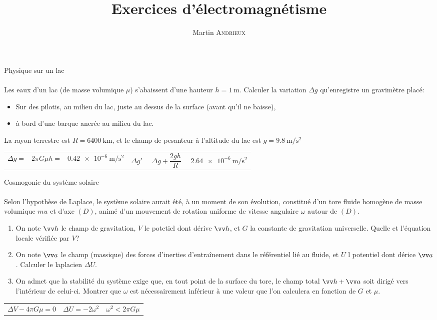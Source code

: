 \documentclass[french, a4paper, 11pt]{article}
\title{Exercices d'électromagnétisme}
\author{Martin \textsc{Andrieux}}
\date{}
\begin{document}
\maketitle

\begin{cadre}{Physique sur un lac}
  \paragraph*{}
  Les eaux d'un lac (de masse volumique \(\mu\)) s'abaissent d'une hauteur \(h=\SI{1}{\meter}\). Calculer la variation \(\Delta g\) qu'enregistre un gravimètre placé:
  \begin{itemize}[label=\(\bullet\)]
    \item Sur des pilotis, au milieu du lac, juste au dessus de la surface (avant qu'il ne baisse),
    \item à bord d'une barque ancrée au milieu du lac.
  \end{itemize}
  La rayon terrestre est \(R=\SI{6400}{\kilo\meter}\), et le champ de pesanteur à l'altitude du lac est \(g=\SI{9,8}{\meter\per\square\second}\)
  \tcblower
  \begin{tabularx}{\linewidth}{Xr}
    \(\Delta g = -2\pi G\mu h = \SI{-0.42e-6}{\meter\per\square\second}\)&
    \(\Delta g' = \Delta g + \dfrac{2gh}{R} = \SI{2.64e-6}{\meter\per\square\second}\)
  \end{tabularx}
\end{cadre}

\begin{cadre}{Cosmogonie du système solaire}
  \paragraph*{}
  Selon l'hypothèse de Laplace, le système solaire aurait été, à un moment de son évolution, constitué d'un tore fluide homogène de masse volumique \(mu\) et d'axe \((D)\), animé d'un mouvement de rotation uniforme de vitesse angulaire \(\omega\) autour de \((D)\).
  \begin{enumerate}[label=\upshape\alph*)]
    \item On note \(\vv h\) le champ de gravitation, \(V\) le potetiel dont dérive \(\vv h\), et \(G\) la constante de gravitation universelle. Quelle et l'équation locale vérifiée par \(V\)?
    \item On note \(\vv a\) le champ (massique) des forces d'inerties d'entraînement dans le référentiel lié au fluide, et \(U\) l potentiel dont dérice \(\vv a\). Calculer le laplacien \(\Delta U\).
    \item On admet que la stabilité du système exige que, en tout point de la surface du tore, le champ total \(\vv h + \vv a\) soit dirigé vers l'intérieur de celui-ci. Montrer que \(\omega\) est nécessairement inférieur à une valeur que l'on calculera en fonction de \(G\) et \(\mu\).
  \end{enumerate}
  \tcblower
  \begin{tabularx}{\linewidth}{XXr}
    \(\Delta V -4\pi G\mu = 0\) & \(\Delta U = -2\omega^{2}\) & \(\omega^{2} < 2\pi G \mu\)
  \end{tabularx}
\end{cadre}
\end{document}
